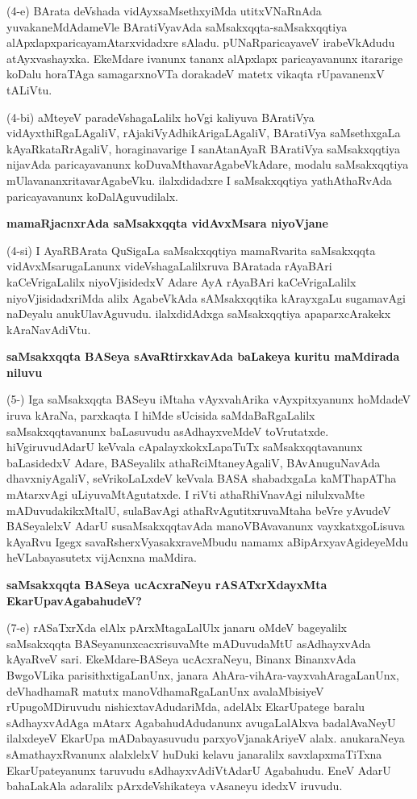 \noindent
(4-e) BArata deVshada vidAyxsaMsethxyiMda utitxVNaRnAda yuvakaneMdAdameVle BAratiVyavAda saM\-sakxqqta-saMsakxqqtiya alApxlapxparicayamAtarxvidadxre sAladu. pUNaRparicayaveV irabeVkAdudu \-atAyx\-vashayxka. EkeMdare ivanunx tananx alApxlapx paricayavanunx itararige koDalu horaTAga samagarxnoVTa dora\-kadeV matetx vikaqta rUpavanenxV tALiVtu.

\smallskip
\noindent
(4-bi) aMteyeV paradeVshagaLalilx hoVgi kaliyuva BAratiVya vidAyxthiRgaLA\-galiV, rAjakiVyAdhi\-kArigaLAgaliV, BAratiVya saMsethxgaLa kAyaRkataRrAgaliV, horaginavarige I sanAtanAyaR BAra\-tiVya saMsakxqqtiya nijavAda paricaya\-vanunx koDuvaMthavarAgabeVkAdare, modalu saMsakxqqtiya mUla\-vananxrita\-varAga\-beVku. ilalxdidadxre I saMsakxqqtiya yathAthaRvAda paricayavanunx koDalAgu\-vudilalx.

{\bigskip
\noindent
{\large\bf mamaRjacnxrAda saMsakxqqta vidAvxMsara niyoVjane}}\label{page32}
\medskip

\noindent
(4-si) I AyaRBArata QuSigaLa saMsakxqqtiya mamaRvarita saMsakxqqta vidAvxMsaru\-gaLanunx videVsha\-gaLalilxruva BAratada rAyaBAri kaCeVrigaLalilx niyoVjisidedxV Adare AyA rAyaBAri kaCeVri\-gaLalilx niyoVjisidadx\-riMda alilx AgabeVkAda sAMsakxqqtika kArayxgaLu sugamavAgi naDeyalu anukUlavAgu\-vudu. ilalxdidAdxga saMsakxqqtiya apaparxcArakekx kAraNavAdiVtu.

{\bigskip
\noindent
{\large\bf saMsakxqqta BASeya sAvaRtirxkavAda baLakeya kuritu maMdirada niluvu}}\label{page33}
\medskip

\noindent
(5-) Iga saMsakxqqta BASeyu iMtaha vAyxvahArika vAyxpitxyanunx hoMdadeV iruva kAraNa, parxkaqta I hiMde sUcisida saMdaBaRgaLalilx saMsakxqqtavanunx baLasuvudu asAdhayx\-veMdeV toVrutatxde. hiVgiruvu\-dAdarU keVvala cApalayxkokxLapaTuTx saMsakxqqta\-vanunx baLasidedxV Adare, BASeyalilx athaRciMtane\-yAgaliV, BAvAnuguNavAda dhavxni\break\-yAgaliV, seVrikoLaLxdeV keVvala BASA shabadxgaLa kaMThapATha mAtarxvAgi uLiyu\-vaMtAgutatxde. I riVti athaRhiVnavAgi nilulxvaMte mADuvudakikxMtalU, sulaBa\-vAgi athaR\-vAgu\-titxru\-vaMtaha beVre yAvudeV BASeyalelxV AdarU susaMsakxqqta\-vAda manoVBAvavanunx vayxkatx\-goLisuva kA\-yaRvu Igegx savaRsherxVyasakxraveMbudu namamx aBipArxyavAgideyeMdu heVLabayasutetx vijAcnxna maMdira.

{\bigskip
\noindent
{\large\bf saMsakxqqta BASeya ucAcxraNeyu rASATxrXdayxMta EkarUpavAgabahudeV?}}\label{page33}
\medskip

\noindent
(7-e) rASaTxrXda elAlx pArxMtagaLalUlx janaru oMdeV bageyalilx saMsakxqqta BASeyanunx\-cacxrisu\-vaMte mADuvu\-daMtU asAdhayxvAda kAyaRveV sari. EkeMdare-BASeya ucAcxraNeyu, Binanx Binanx\-vAda BwgoV\-Lika parisithxtigaLanUnx, janara AhAra-\-vihAra\--vayxvahAragaLanUnx, deVhadhamaR matutx manoVdha\-maRgaLanUnx avalaMbisiyeV rUpugoMDiruvudu nishicxtavAdudariMda, adelAlx EkarUpatege baralu sAdhayx\-vAdAga mAtarx AgabahudAdudanunx avugaLalAlxva badalAvaNeyU ilalxdeyeV EkarUpa mADa\-bayasuvudu parxyoVjanakAriyeV alalx. anukaraNeya sAmathayxRvanunx alalxlelxV huDuki kelavu jana\-ralilx savxlapxmaTiTxna EkarUpateyanunx taruvudu sAdhayxvAdiVtAdarU Agabahudu. EneV AdarU bahaLa\-kAla adaralilx pArxdeV\-shikateya vAsaneyu idedxV iruvudu.

